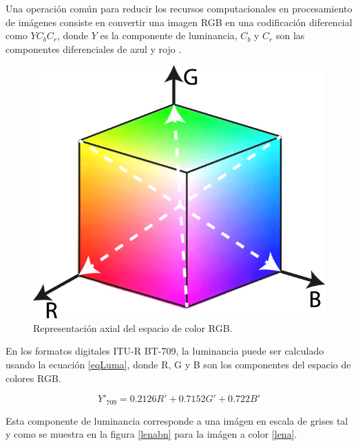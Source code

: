 \documentclass[twoside,spanish,ESP,MSc]{plantillaLabUPV}
\theoremstyle{definition}
\begin{document}
Una operación común para reducir los recursos computacionales en procesamiento de imágenes consiste en convertir una imagen RGB en una codificación diferencial como $YC_bC_r$, donde $Y$ es la componente de luminancia, $C_b$ y $C_r$ son las componentes diferenciales de azul y rojo \cite{Book_IVSS}.\\

\begin{figure}[h] 
	\centering 
		\includegraphics[scale=.35]{ima/rgbcol} 
	\caption{Representación axial del espacio de color RGB.} 
	\label{rgbcol} 
\end{figure}

En los formatos digitales ITU-R BT-709, la luminancia puede ser calculado usando la ecuación \ref{eqLuma}, donde R, G y B son los componentes del espacio de colores RGB.

\begin{equation}\label{eqLuma}
{\displaystyle Y'_{\text{709}}=0.2126R'+0.7152G'+0.722B'}
\end{equation}

Esta componente de luminancia corresponde a una imágen en escala de grises tal y como se muestra en la figura \ref{lenabn} para la imágen a color \ref{lena}.
\end{document}
